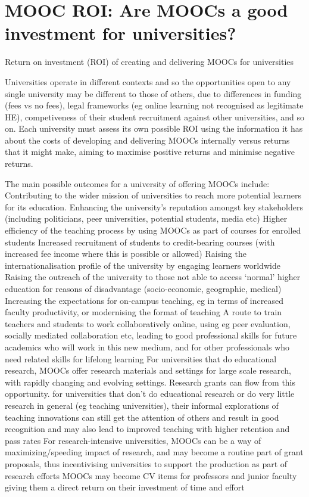 \section{MOOC ROI: Are MOOCs a good investment for universities?}


Return on investment (ROI) of creating and delivering MOOCs for
universities
 
Universities operate in different contexts and so the opportunities open
to any single university may be different to those of others, due to
differences in funding (fees vs no fees), legal frameworks (eg online
learning not recognised as legitimate HE), competiveness of their
student recruitment against other universities, and so on.  Each
university must assess its own possible ROI using the information it has
about the costs of developing and delivering MOOCs internally versus
returns that it might make, aiming to maximise positive returns and
minimise negative returns.
 
 
The main possible outcomes for a university of offering MOOCs include:
Contributing to the wider mission of universities to reach more
potential learners for its education.  Enhancing the university’s
reputation amongst key stakeholders (including politicians, peer
universities, potential students, media etc) Higher efficiency of the
teaching process by using MOOCs as part of courses for enrolled students
Increased recruitment of students to credit-bearing courses (with
increased fee income where this is possible or allowed) Raising the
internationalisation profile of the university by engaging learners
worldwide Raising the outreach of the university to those not able to
access ‘normal’ higher education for reasons of disadvantage
(socio-economic, geographic, medical) Increasing the expectations for
on-campus teaching, eg in terms of increased faculty productivity, or
modernising the format of teaching A route to train teachers and
students to work collaboratively online, using eg peer evaluation,
socially mediated collaboration etc, leading to good professional skills
for future academics who will work in this new medium, and for other
professionals who need related skills for lifelong learning For
universities that do educational research, MOOCs offer research
materials and settings for large scale research, with rapidly changing
and evolving settings. Research grants can flow from this opportunity.
for universities that don't do educational research or do very little
research in general (eg teaching universities), their informal
explorations of teaching innovations can still get the attention of
others and result in good recognition and may also lead to improved
teaching with higher retention and pass rates For research-intensive
universities, MOOCs can be a way of maximizing/speeding impact of
research, and may become a routine part of grant proposals, thus
incentivising universities to support the production as part of research
efforts MOOCs may become CV items for professors and junior faculty
giving them a direct return on their investment of time and effort
 
